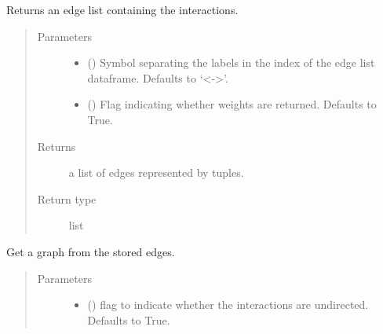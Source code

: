 \documentclass[letterpaper,10pt,english]{sphinxmanual}
\begin{document}
\begin{fulllineitems}
\begin{fulllineitems}
\label{\detokenize{_modules/cosifer.collections:cosifer.collections.interaction_table.InteractionTable.to_edge_list}}
Returns an edge list containing the interactions.
\begin{quote}\begin{description}
\item[{Parameters}] \leavevmode\begin{itemize}
\item {} 
 (\sphinxstyleliteralemphasis{\sphinxupquote{, }}) \textendash{} Symbol separating the labels
in the index of the edge list dataframe. Defaults to ‘\textless{}-\textgreater{}’.

\item {} 
 (\sphinxstyleliteralemphasis{\sphinxupquote{, }}) \textendash{} Flag indicating whether weights are
returned. Defaults to True.

\end{itemize}

\item[{Returns}] \leavevmode
a list of edges represented by tuples.

\item[{Return type}] \leavevmode
list

\end{description}\end{quote}

\end{fulllineitems}


\begin{fulllineitems}
\label{\detokenize{_modules/cosifer.collections:cosifer.collections.interaction_table.InteractionTable.to_graph}}
Get a graph from the stored edges.
\begin{quote}\begin{description}
\item[{Parameters}] \leavevmode\begin{itemize}
\item {} 
 (\sphinxstyleliteralemphasis{\sphinxupquote{, }}) \textendash{} flag to indicate whether the
interactions are undirected. Defaults to True.


\end{itemize}
\end{description}
\end{quote}
\end{fulllineitems}
\end{fulllineitems}
\end{document}
